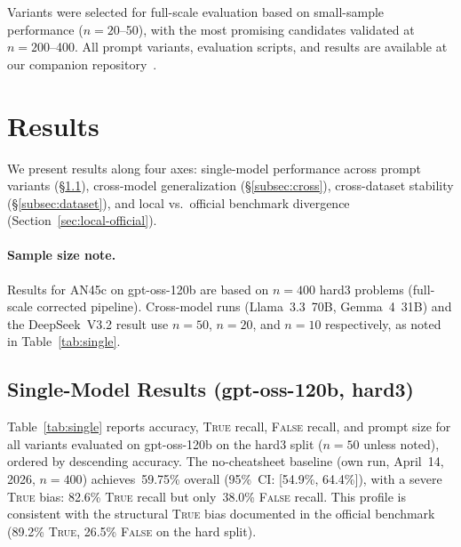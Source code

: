 \documentclass[11pt]{article}
\begin{document}
Variants were selected for full-scale evaluation based on
small-sample performance ($n=20$--50), with the most promising
candidates validated at $n=200$--400. All prompt variants, evaluation
scripts, and results are available at our companion
repository~\citep{cazares2026sair}.

\section{Results}
\label{sec:results}

We present results along four axes: single-model performance across
prompt variants (\S\ref{subsec:single}), cross-model generalization
(\S\ref{subsec:cross}), cross-dataset stability
(\S\ref{subsec:dataset}), and local vs.\ official benchmark divergence
(Section~\ref{sec:local-official}).

\paragraph{Sample size note.}
Results for AN45c on gpt-oss-120b are based on $n=400$ hard3
problems (full-scale corrected pipeline). Cross-model runs
(Llama~3.3~70B, Gemma~4~31B) and the DeepSeek~V3.2 result
use $n=50$, $n=20$, and $n=10$ respectively, as noted in
Table~\ref{tab:single}.

\subsection{Single-Model Results (gpt-oss-120b, hard3)}
\label{subsec:single}

Table~\ref{tab:single} reports accuracy, \textsc{True} recall,
\textsc{False} recall, and prompt size for all variants evaluated on
gpt-oss-120b on the hard3 split ($n=50$ unless noted), ordered by
descending accuracy. The no-cheatsheet baseline (own run, April~14,
2026, $n=400$) achieves~59.75\% overall (95\%~CI: [54.9\%, 64.4\%]),
with a severe \textsc{True} bias: 82.6\% \textsc{True} recall but
only~38.0\% \textsc{False} recall. This profile is consistent with
the structural \textsc{True} bias documented in the official benchmark
(89.2\% \textsc{True}, 26.5\% \textsc{False} on the hard split).
\end{document}
